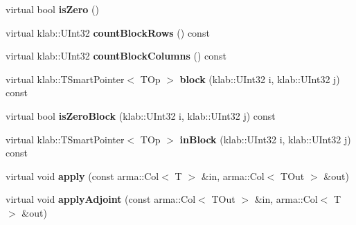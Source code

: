 \begin{DoxyCompactItemize}
\item 
virtual bool {\bfseries is\+Zero} ()\hypertarget{classkl1p_1_1TColumnJointOperator_aeb7aff5eb413b3a9aac72a90d4aced9d}{}\label{classkl1p_1_1TColumnJointOperator_aeb7aff5eb413b3a9aac72a90d4aced9d}

\item 
virtual klab\+::\+U\+Int32 {\bfseries count\+Block\+Rows} () const \hypertarget{classkl1p_1_1TColumnJointOperator_a1fc0609bedf1c849bc64f6535d53360a}{}\label{classkl1p_1_1TColumnJointOperator_a1fc0609bedf1c849bc64f6535d53360a}

\item 
virtual klab\+::\+U\+Int32 {\bfseries count\+Block\+Columns} () const \hypertarget{classkl1p_1_1TColumnJointOperator_a6de3a65aa4d4769dfb0eb7556877b2fc}{}\label{classkl1p_1_1TColumnJointOperator_a6de3a65aa4d4769dfb0eb7556877b2fc}

\item 
virtual klab\+::\+T\+Smart\+Pointer$<$ T\+Op $>$ {\bfseries block} (klab\+::\+U\+Int32 i, klab\+::\+U\+Int32 j) const \hypertarget{classkl1p_1_1TColumnJointOperator_a26b5e1eee5a563028fea9605e73e78b6}{}\label{classkl1p_1_1TColumnJointOperator_a26b5e1eee5a563028fea9605e73e78b6}

\item 
virtual bool {\bfseries is\+Zero\+Block} (klab\+::\+U\+Int32 i, klab\+::\+U\+Int32 j) const \hypertarget{classkl1p_1_1TColumnJointOperator_a16e900f678d80c2de31344ab4341b366}{}\label{classkl1p_1_1TColumnJointOperator_a16e900f678d80c2de31344ab4341b366}

\item 
virtual klab\+::\+T\+Smart\+Pointer$<$ T\+Op $>$ {\bfseries in\+Block} (klab\+::\+U\+Int32 i, klab\+::\+U\+Int32 j) const \hypertarget{classkl1p_1_1TColumnJointOperator_ae33cbd4735dfd7e30f1773fe3e875e57}{}\label{classkl1p_1_1TColumnJointOperator_ae33cbd4735dfd7e30f1773fe3e875e57}

\item 
virtual void {\bfseries apply} (const arma\+::\+Col$<$ T $>$ \&in, arma\+::\+Col$<$ T\+Out $>$ \&out)\hypertarget{classkl1p_1_1TColumnJointOperator_a0bd2f7e3656fd14e8328063bde591bc0}{}\label{classkl1p_1_1TColumnJointOperator_a0bd2f7e3656fd14e8328063bde591bc0}

\item 
virtual void {\bfseries apply\+Adjoint} (const arma\+::\+Col$<$ T\+Out $>$ \&in, arma\+::\+Col$<$ T $>$ \&out)\hypertarget{classkl1p_1_1TColumnJointOperator_af15492ac3423bfaad5456c99c8236fb9}{}\label{classkl1p_1_1TColumnJointOperator_af15492ac3423bfaad5456c99c8236fb9}


\end{DoxyCompactItemize}
